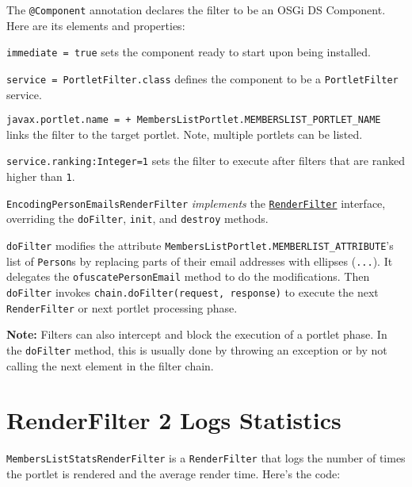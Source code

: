The \texttt{@Component} annotation declares the filter to be an OSGi DS
Component. Here are its elements and properties:

\texttt{immediate\ =\ true} sets the component ready to start upon being
installed.

\texttt{service\ =\ PortletFilter.class} defines the component to be a
\texttt{PortletFilter} service.

\texttt{javax.portlet.name\ =\ +\ MembersListPortlet.MEMBERSLIST\_PORTLET\_NAME}
links the filter to the target portlet. Note, multiple portlets can be
listed.

\texttt{service.ranking:Integer=1} sets the filter to execute after
filters that are ranked higher than \texttt{1}.

\texttt{EncodingPersonEmailsRenderFilter} \emph{implements} the
\href{http://docs.liferay.com/portlet-api/3.0/javadocs/javax/portlet/filter/RenderFilter.html}{\texttt{RenderFilter}}
interface, overriding the \texttt{doFilter}, \texttt{init}, and
\texttt{destroy} methods.

\texttt{doFilter} modifies the attribute
\texttt{MembersListPortlet.MEMBERLIST\_ATTRIBUTE}'s list of
\texttt{Person}s by replacing parts of their email addresses with
ellipses (\texttt{...}). It delegates the \texttt{ofuscatePersonEmail}
method to do the modifications. Then \texttt{doFilter} invokes
\texttt{chain.doFilter(request,\ response)} to execute the next
\texttt{RenderFilter} or next portlet processing phase.

\noindent\hrulefill

\textbf{Note:} Filters can also intercept and block the execution of a
portlet phase. In the \texttt{doFilter} method, this is usually done by
throwing an exception or by not calling the next element in the filter
chain.

\noindent\hrulefill

\section{RenderFilter 2 Logs
Statistics}\label{renderfilter-2-logs-statistics}

\texttt{MembersListStatsRenderFilter} is a \texttt{RenderFilter} that
logs the number of times the portlet is rendered and the average render
time. Here's the code:


